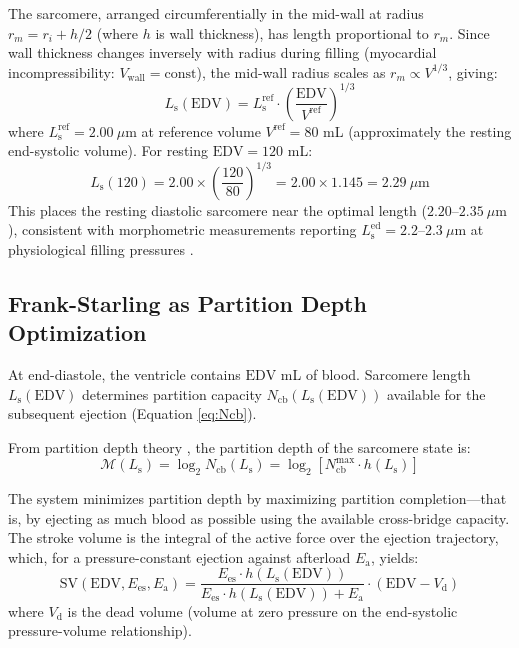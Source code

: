 \documentclass[12pt,a4paper]{article}
\theoremstyle{remark}
\newcommand{\Ees}{E_{\mathrm{es}}}
\newcommand{\Ea}{E_{\mathrm{a}}}
\newcommand{\Vd}{V_{\mathrm{d}}}
\newcommand{\SV}{\mathrm{SV}}
\newcommand{\EDV}{\mathrm{EDV}}
\newcommand{\Ncb}{N_{\mathrm{cb}}}
\newcommand{\Ls}{L_{\mathrm{s}}}
\begin{document}
The sarcomere, arranged circumferentially in the mid-wall at radius $r_m = r_i + h/2$ (where $h$ is wall thickness), has length proportional to $r_m$. Since wall thickness changes inversely with radius during filling (myocardial incompressibility: $V_{\mathrm{wall}} = \mathrm{const}$), the mid-wall radius scales as $r_m \propto V^{1/3}$, giving:
\begin{equation}
    \Ls(\EDV) = \Ls^{\mathrm{ref}} \cdot \left(\frac{\EDV}{V^{\mathrm{ref}}}\right)^{1/3}
    \label{eq:Ls_EDV}
\end{equation}
where $\Ls^{\mathrm{ref}} = 2.00~\mu\mathrm{m}$ at reference volume $V^{\mathrm{ref}} = 80$ mL (approximately the resting end-systolic volume). For resting $\EDV = 120$ mL:
\begin{equation}
    \Ls(120) = 2.00 \times \left(\frac{120}{80}\right)^{1/3} = 2.00 \times 1.145 = 2.29~\mu\mathrm{m}
\end{equation}
This places the resting diastolic sarcomere near the optimal length ($2.20$--$2.35~\mu\mathrm{m}$), consistent with morphometric measurements reporting $\Ls^{\mathrm{ed}} = 2.2$--$2.3~\mu\mathrm{m}$ at physiological filling pressures \cite{rodriguez1992stress}.

\subsection{Frank-Starling as Partition Depth Optimization}

At end-diastole, the ventricle contains $\EDV$ mL of blood. Sarcomere length $\Ls(\EDV)$ determines partition capacity $\Ncb(\Ls(\EDV))$ available for the subsequent ejection (Equation \ref{eq:Ncb}).

From partition depth theory \cite{sachikonye2024gas}, the partition depth of the sarcomere state is:
\begin{equation}
    \mathcal{M}(\Ls) = \log_2 \Ncb(\Ls) = \log_2[\Ncb^{\max} \cdot h(\Ls)]
\end{equation}

The system minimizes partition depth by maximizing partition completion—that is, by ejecting as much blood as possible using the available cross-bridge capacity. The stroke volume is the integral of the active force over the ejection trajectory, which, for a pressure-constant ejection against afterload $\Ea$, yields:
\begin{equation}
    \SV(\EDV, \Ees, \Ea) = \frac{\Ees \cdot h(\Ls(\EDV))}{\Ees \cdot h(\Ls(\EDV)) + \Ea} \cdot (\EDV - \Vd)
    \label{eq:frank_starling}
\end{equation}
where $\Vd$ is the dead volume (volume at zero pressure on the end-systolic pressure-volume relationship).
\end{document}
